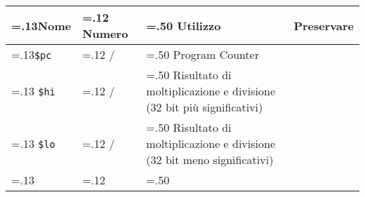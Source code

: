 \documentclass[varwidth=6in]{standalone}
\newcommand\lightrule{%
	\arrayrulecolor{black!30}%
	\midrule[\lightrulewidth]%
	\arrayrulecolor{black}}
\newcommand\register[1]{%
	\texttt{#1}%
}
\begin{document}
	\begin{tabularx}{\textwidth}{ >{\hsize=.13\textwidth}X >{\hsize=.12\textwidth}X >{\hsize=.50\textwidth}X X }
		\toprule
			Nome & Numero & Utilizzo & Preservare \\
		\midrule
			\register{\$pc} & / & Program Counter \\\lightrule
			\register{\$hi} & / & Risultato di moltiplicazione e divisione (\(32\) bit più significativi)\\\lightrule
			\register{\$lo} & / & Risultato di moltiplicazione e divisione (\(32\) bit meno significativi)\\\lightrule
			\bottomrule
	\end{tabularx}
\end{document}
